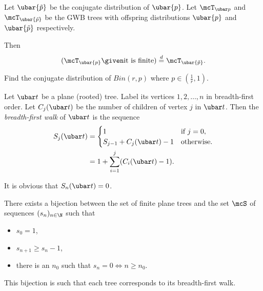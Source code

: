 \begin{theorem*}
    Let $\ubar{\tilde{p}}$ be the conjugate distribution of $\ubar{p}$.
    Let $\mcT_{\ubar p}$ and $\mcT_{\ubar{\tilde p}}$
    be the GWB trees with offspring distributions
    $\ubar{p}$ and $\ubar{\tilde{p}}$ respectively.

    Then \[
        (\mcT_{\ubar{p}} \given \text{it is finite})
            \eqd \mcT_{\ubar{\tilde{p}}}.
    \]
\end{theorem*}

\begin{exercise}
    Find the conjugate distribution of $Bin(r, p)$ where
    $p \in (\frac1r, 1)$.
\end{exercise}

\begin{definition*} \label{def:bfs}
    Let $\ubar t$ be a plane (rooted) tree.
    Label its vertices $1, 2, \dots, n$ in breadth-first order.
    Let $C_j(\ubar t)$ be the number of children of vertex $j$ in $\ubar t$.
    Then the \emph{breadth-first walk} of $\ubar t$ is the sequence
    \begin{align*}
        S_j(\ubar t) &= \begin{cases}
            1 & \text{if } j = 0, \\
            S_{j-1} + C_j(\ubar t) - 1 & \text{otherwise}.
        \end{cases} \\
        &= 1 + \sum_{i=1}^j (C_i(\ubar t) - 1).
    \end{align*}
\end{definition*}
It is obvious that $S_n(\ubar t) = 0$.

\begin{theorem*}
    There exists a bijection between the set of finite plane trees and the
    set $\mcS$ of sequences $(s_n)_{n \in \N}$ such that
    \begin{itemize}
        \item $s_0 = 1$,
        \item $s_{n+1} \ge s_n - 1$,
        \item there is an $n_0$ such that $s_n = 0 \iff n \ge n_0$.
    \end{itemize}
    This bijection is such that each tree corresponds to its breadth-first
    walk.
\end{theorem*}
